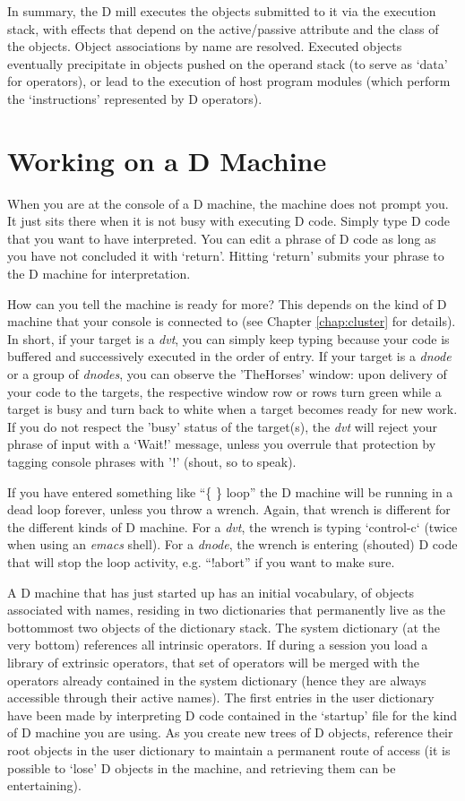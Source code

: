 In  summary,  the D mill executes the objects submitted to it via  the execution stack, with effects that depend on the active/passive attribute and the class of the objects.  Object associations by name are resolved. Executed objects eventually precipitate in objects pushed on the operand  stack  (to  serve  as `data' for  operators),  or  lead  to  the execution  of  host  program modules (which  perform  the  `instructions' represented by D operators).


\section{Working on a D Machine}\label{sec:works}

When you are at the console of a D machine, the machine does not prompt you. It just sits there when it is not busy with executing D code. Simply type D code that you want to have interpreted. You can edit a phrase of D code as long as you have not concluded it with `return'. Hitting `return' submits your phrase to the D machine for interpretation.

How can you tell the machine is ready for more? This depends on the kind of D machine that your console is connected to (see Chapter \ref{chap:cluster} for details). In short, if your target is a \emph{dvt}, you can simply keep typing because your code is buffered and successively executed in the order of entry. If your target is a \emph{dnode} or a group of \emph{dnodes}, you can observe the 'TheHorses' window: upon delivery of your code to the targets, the respective window row or rows turn green while a target is busy and turn back to white when a target becomes ready for new work. If you do not respect the 'busy' status of the target(s), the \emph{dvt} will reject your phrase of input with a `Wait!' message, unless you overrule that protection by tagging console phrases with '!' (shout, so to speak).

If you have entered something like ``\{ \} loop'' the D machine will be running in a dead loop forever, unless you throw a wrench. Again, that wrench is different for the different kinds of D machine. For a \emph{dvt}, the wrench is typing `control-c` (twice when using an \emph{emacs} shell). For a \emph{dnode}, the wrench is entering (shouted) D code that will stop the loop activity, e.g. ``!abort'' if you want to make sure. 

A D machine that has just started up has an initial vocabulary, of objects associated with names, residing in two dictionaries that permanently live as the bottommost two objects of the dictionary stack. The system dictionary (at the very bottom) references all intrinsic operators. If during a session you load a library of extrinsic operators, that set of operators will be merged with the operators already contained in the system dictionary (hence they are always accessible through their active names). The first entries in the user dictionary have been made by interpreting D code contained in the `startup' file for the kind of D machine you are using.  As you create new trees of D objects, reference their root objects in the user dictionary to maintain a permanent route of access (it is possible to `lose' D objects in the machine, and retrieving them can be entertaining).

